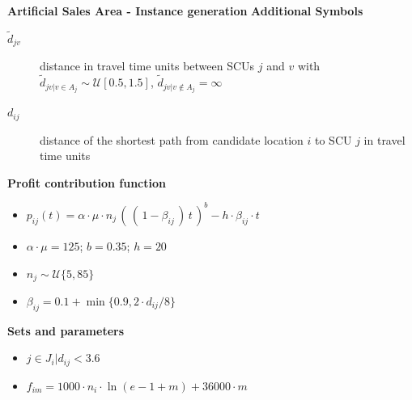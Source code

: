 \begin{frame}{\textbf{Artificial Sales Area - Instance generation}}
\textbf{Additional Symbols}
\begin{description}
  \item[$\tilde{d}_{jv}$] distance in travel time units between SCUs $j$ and $v$ with $\tilde{d}_{jv|v \in A_j} \sim \mathcal{U}[0.5,1.5]$, $\tilde{d}_{jv|v \notin A_j}=\infty$
  \item[$d_{ij}$] distance of the shortest path from candidate location $i$ to SCU $j$ in travel time units
\end{description}

\textbf{Profit contribution function}
\begin{itemize}
\item $p_{ij}(t) = \alpha \cdot \mu \cdot n_j \, (\, (\, 1- \beta_{ij} \,)\, t\, ) ^ b - h \cdot \beta_{ij} \cdot t$
\item $\alpha \cdot \mu = 125$; $b=0.35$; $h=20$
\item $n_j \sim \mathcal{U}\{5,85\}$
\item $\beta_{ij}=0.1+ \min \{0.9,2 \cdot d_{ij}/8\} $
\end{itemize}


\textbf{Sets and parameters}
\begin{itemize}
    \item $j \in J_i|d_{ij} < 3.6$ 
    \item $f_{im} = 1000 \cdot n_{i} \cdot \ln{(e-1+m)} + 36000 \cdot m$
\end{itemize}

\end{frame}






